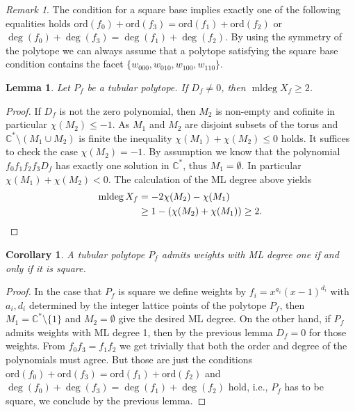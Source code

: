 \documentclass[12pt,reqno]{amsart}   	%
\theoremstyle{plain}
\newtheorem{lemma}[theorem]{Lemma}
\newtheorem{corollary}[theorem]{Corollary}
\theoremstyle{definition}
\theoremstyle{remark}
\newtheorem{remark}[theorem]{Remark}
\newcommand{\C}{\mathbb{C}}
\newcommand{\mldeg}{\operatorname{mldeg}}
\newcommand{\ord}{\mathrm{ord}}
\begin{document}
\begin{remark}
    The condition for a square base implies exactly one of the following equalities holds $\ord(f_0)+\ord(f_3) = \ord(f_1)+\ord(f_2)$ or $\deg (f_0) + \deg (f_3) = \deg (f_1) + \deg (f_2)$. By using the symmetry of the polytope we can always assume that a polytope satisfying the square base condition contains the facet $\{w_{000},w_{010},w_{100},w_{110} \}$. 
\end{remark}
\begin{lemma} \label{nonvanishing D}
    Let $P_f$ be a tubular polytope. If $D_{f} \neq 0$, then $\mldeg X_{f} \geq 2$.
\end{lemma}
\begin{proof}
    If $D_{f}$ is not the zero polynomial, then $M_2$ is non-empty and cofinite in particular $\chi(M_2)\leq -1$. As $M_1$ and $M_2$ are disjoint subsets of the torus and $\C^\ast \setminus (M_1 \cup M_2)$ is finite the inequality $\chi(M_1)+ \chi(M_2) \leq 0$ holds.
    It suffices to check the case $\chi (M_2) = -1$. By assumption we know that the polynomial $f_0f_1f_2f_3D_{f}$ has exactly one solution in $\C^\ast$, thus $M_1 = \emptyset$. In particular $\chi (M_1) + \chi (M_2) < 0$. The calculation of the ML degree above yields
    \begin{align*}
        \mldeg X_{f} &= -2\chi(M_2)-\chi(M_1) \\
        & \geq 1 - (\chi(M_2)+\chi(M_1)) \geq 2. \qedhere
    \end{align*}
\end{proof}
\begin{corollary}
   A tubular polytope $P_f$ admits weights with ML degree one if and only if it is square.
\end{corollary}
\begin{proof}
    In the case that $P_f$ is square we define weights by $f_i = x^{a_i}(x-1)^{d_i}$ with $a_i,d_i$ determined by the integer lattice points of the polytope $P_f$, then $M_1 = \C^\ast \setminus \{ 1 \}$ and $M_2 = \emptyset$ give the desired ML degree. On the other hand, if $P_f$ admits weights with ML degree 1, then by the previous lemma $D_f =0$ for those weights. From $f_0f_3 = f_1f_2$ we get trivially that both the order and degree of the polynomials must agree. But those are just the conditions $\ord(f_0)+\ord(f_3) = \ord(f_1)+\ord(f_2)$ and $\deg (f_0) + \deg (f_3) = \deg (f_1) + \deg (f_2)$ hold, i.e., $P_f$ has to be square, we conclude by the previous lemma.
\end{proof}
\end{document}
